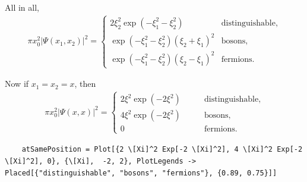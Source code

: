 \documentclass[11pt]{article}
\begin{document}
\begin{enumerate}[label=\textbf{\arabic*}.]
\begin{enumerate}
            All in all,
            \begin{equation*}
                \boxed{
                    \begin{aligned}
                        \pi x_0^2 |\Psi(x_1, x_2)|^2 = \begin{cases}
                            2\xi_2^2 \exp(-\xi_1^2 - \xi_2^2) \qquad & \text{distinguishable,} \\
                            \exp(-\xi_1^2 - \xi_2^2) (\xi_2 + \xi_1)^2 & \text{bosons,} \\
                            \exp(-\xi_1^2 - \xi_2^2) (\xi_2 - \xi_1)^2 & \text{fermions.}
                        \end{cases}
                    \end{aligned}
                }
            \end{equation*}

            Now if $x_1 = x_2 = x$, then
            \begin{equation*}
                \boxed{
                    \begin{aligned}
                        \pi x_0^2 |\Psi(x, x)|^2 = \begin{cases}
                            2\xi^2 \exp(-2\xi^2) \qquad & \text{distinguishable,} \\
                            4\xi^2\exp(-2\xi^2) & \text{bosons,} \\
                            0 & \text{fermions.}
                        \end{cases}
                    \end{aligned}
                }
            \end{equation*}
    \end{enumerate}
\end{enumerate}

\begin{lstlisting}
    atSamePosition = Plot[{2 \[Xi]^2 Exp[-2 \[Xi]^2], 4 \[Xi]^2 Exp[-2 \[Xi]^2], 0}, {\[Xi],  -2, 2}, PlotLegends -> Placed[{"distinguishable", "bosons", "fermions"}, {0.89, 0.75}]]
\end{lstlisting}
\end{document}
